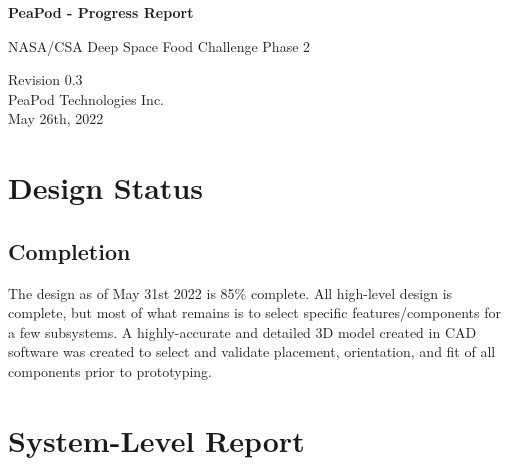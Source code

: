 \documentclass{../tex/report}
\begin{document}
\begin{titlepage}
    \begin{center}
        \vspace*{1.2cm}

        \textbf{\large{PeaPod - Progress Report}}

        \vspace{0.5cm}

        NASA/CSA Deep Space Food Challenge Phase 2

        \vfill
        
        \vspace{.75cm}

        Revision 0.3\\
        PeaPod Technologies Inc.\\
        May 26th, 2022

    \end{center}
\end{titlepage}

\thispagestyle{plain}

\tableofcontents
\clearpage

\section{Design Status}

\subsection{Completion}

The design as of May 31st 2022 is 85\% complete. All high-level design is complete, but most of what remains is to select specific features/components for a few subsystems. A highly-accurate and detailed 3D model created in CAD software was created to select and validate placement, orientation, and fit of all components prior to prototyping.



\clearpage

\section{System-Level Report}



\clearpage
\end{document}
